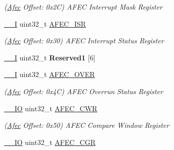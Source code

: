 \begin{DoxyCompactItemize}
\begin{DoxyCompactList}\small\item\em (\mbox{\hyperlink{structAfec}{Afec}} Offset\+: 0x2C) A\+F\+EC Interrupt Mask Register \end{DoxyCompactList}\item 
\mbox{\label{structAfec_ae1190e24f761f4753b4cbdb5cba72ef2}} 
\mbox{\hyperlink{core__cm7_8h_af63697ed9952cc71e1225efe205f6cd3}{\+\_\+\+\_\+I}} uint32\+\_\+t \mbox{\hyperlink{structAfec_ae1190e24f761f4753b4cbdb5cba72ef2}{A\+F\+E\+C\+\_\+\+I\+SR}}
\begin{DoxyCompactList}\small\item\em (\mbox{\hyperlink{structAfec}{Afec}} Offset\+: 0x30) A\+F\+EC Interrupt Status Register \end{DoxyCompactList}\item 
\mbox{\label{structAfec_a5aae0f66e98c4e4aa12be22e23b8d886}} 
\mbox{\hyperlink{core__cm7_8h_af63697ed9952cc71e1225efe205f6cd3}{\+\_\+\+\_\+I}} uint32\+\_\+t {\bfseries Reserved1} \mbox{[}6\mbox{]}
\item 
\mbox{\label{structAfec_aa860cb580b3b8026bd061d8d26fdbe94}} 
\mbox{\hyperlink{core__cm7_8h_af63697ed9952cc71e1225efe205f6cd3}{\+\_\+\+\_\+I}} uint32\+\_\+t \mbox{\hyperlink{structAfec_aa860cb580b3b8026bd061d8d26fdbe94}{A\+F\+E\+C\+\_\+\+O\+V\+ER}}
\begin{DoxyCompactList}\small\item\em (\mbox{\hyperlink{structAfec}{Afec}} Offset\+: 0x4C) A\+F\+EC Overrun Status Register \end{DoxyCompactList}\item 
\mbox{\label{structAfec_a8080af793cfe3d1157fd16c09ccf93d6}} 
\mbox{\hyperlink{core__cm7_8h_aec43007d9998a0a0e01faede4133d6be}{\+\_\+\+\_\+\+IO}} uint32\+\_\+t \mbox{\hyperlink{structAfec_a8080af793cfe3d1157fd16c09ccf93d6}{A\+F\+E\+C\+\_\+\+C\+WR}}
\begin{DoxyCompactList}\small\item\em (\mbox{\hyperlink{structAfec}{Afec}} Offset\+: 0x50) A\+F\+EC Compare Window Register \end{DoxyCompactList}\item 
\mbox{\label{structAfec_aed7e6832afd27e46e49e28b0ec019f3a}} 
\mbox{\hyperlink{core__cm7_8h_aec43007d9998a0a0e01faede4133d6be}{\+\_\+\+\_\+\+IO}} uint32\+\_\+t \mbox{\hyperlink{structAfec_aed7e6832afd27e46e49e28b0ec019f3a}{A\+F\+E\+C\+\_\+\+C\+GR}}

\end{DoxyCompactItemize}
